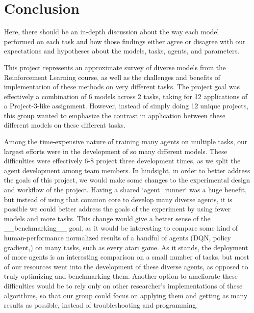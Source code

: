 \documentclass[conference]{IEEEtran}
\begin{document}
\section{Conclusion} \label{conclusion}
Here, there should be an in-depth discussion about the way each model performed on each task and how those findings either agree or disagree with our expectations and hypotheses about the models, tasks, agents, and parameters.

This project represents an approximate survey of diverse models from the Reinforcement Learning course, as well as the challenges and benefits of implementation of these methods on very different tasks. The project goal was effectively a combination of 6 models across 2 tasks, taking for 12 applications of a Project-3-like assignment. However, instead of simply doing 12 unique projects, this group wanted to emphasize the contrast in application between these different models on these different tasks.

Among the time-expensive nature of training many agents on multiple tasks, our largest efforts were in the development of so many different models. These difficulties were effectively 6-8 project three development times, as we split the agent development among team members. In hindsight, in order to better address the goals of this project, we would make some changes to the experimental design and workflow of the project. Having a shared `agent\_runner` was a huge benefit, but instead of using that common core to develop many diverse agents, it is possible we could better address the goals of the experiment by using fewer models and more tasks. This change would give a better sense of the \_\_benchmarking\_\_ goal, as it would be interesting to compare some kind of human-performance normalized results of a handful of agents (DQN, policy gradient,) on many tasks, such as every atari game. As it stands, the deployment of more agents is an interesting comparison on a small number of tasks, but most of our resources went into the development of these diverse agents, as opposed to truly optimizing and benchmarking them. Another option to ameliorate these difficulties would be to rely only on other researcher's implementations of these algorithms, so that our group could focus on applying them and getting as many results as possible, instead of troubleshooting and programming.

{}


\vspace{12pt}
\end{document}
